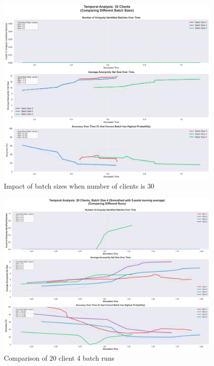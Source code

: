 \documentclass{article}
\begin{document}
\begin{figure}[!htb]
\centering
\includegraphics[width=\textwidth]{diagrams/temporal_5_smoothed_30_clients.png}
\caption{Impact of batch sizes when number of clients is 30}
\label{fig:temporal_analysis_30}
\end{figure}

\begin{figure}[!htb]
\centering
\includegraphics[width=\textwidth]{diagrams/temporal_20client_4batch_runs.png}
\caption{Comparison of 20 client 4 batch runs}
\label{fig:temporal_analysis_20_4_runs}
\end{figure}
\end{document}
